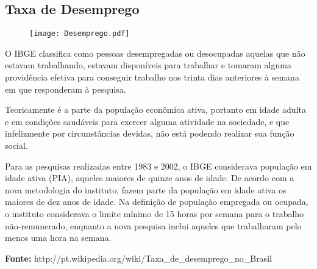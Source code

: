\documentclass[../../relatorio.tex]{subfiles}
\begin{document}
\subsection{Taxa de Desemprego}

\begin{figure}[ht]
  \begin{minipage}{0.70\textheight}
    \centering
      \texttt{[image: Desemprego.pdf]}
  \end{minipage}
\end{figure}

O IBGE classifica como pessoas desempregadas ou desocupadas aquelas que não estavam trabalhando, estavam disponíveis para trabalhar e tomaram alguma providência efetiva para conseguir trabalho nos trinta dias anteriores à semana em que responderam à pesquisa.

Teoricamente é a parte da população econômica ativa, portanto em idade adulta e em condições saudáveis para exercer alguma atividade na sociedade, e que infelizmente por circunstâncias devidas, não está podendo realizar sua função social.

Para as pesquisas realizadas entre 1983 e 2002, o IBGE considerava população em idade ativa (PIA), aqueles maiores de quinze anos de idade. De acordo com a nova metodologia do instituto, fazem parte da população em idade ativa os maiores de dez anos de idade. Na definição de população empregada ou ocupada, o instituto considerava o limite mínimo de 15 horas por semana para o trabalho não-remunerado, enquanto a nova pesquisa inclui aqueles que trabalharam pelo menos uma hora na semana.

\textbf{Fonte:} http://pt.wikipedia.org/wiki/Taxa\_de\_desemprego\_no\_Brasil

\pagebreak
\end{document}
